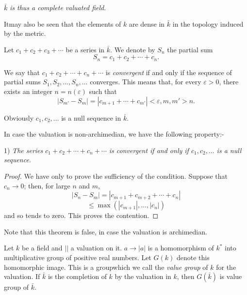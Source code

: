 $\bar{k}$ \textit{is thus a complete valuated field}. 

It\pageoriginale may also be seen that the elements of $k$ are dense
in $\bar{k}$ in the topology induced by the metric.  

Let $c_1 + c_2 + c_3 +  \cdots $ be a series in $\bar{k}$. We denote
by $S_n$ the partial sum 
$$
S_n = c_1 + c_2 + \cdots + c_n .
$$

We say that $c_1 + c_2 + \cdots + c_n + \cdots$ is \textit{convergent}
if and only if the sequence of partial sums $S_1 , S_2 , \ldots , 
S_n , \ldots$ converges. This means that, for every $\varepsilon > 0$,
there exists an integer $n = n(\varepsilon)$ such that 
$$
|S_{m'} - S_m| = |c_{m+1} + \cdots + c_{m'}| < \varepsilon , m, m' > n .
$$

Obviously $c_1 , c_2 , \ldots $ is a null sequence in $\bar{k}$.

In case the valuation is non-archimedian, we have the following
property:- 

1) \textit{The series $c_1 + c_2 + \cdots + c_n + \cdots$ is
  convergent if and only if $c_1 , c_2 , \ldots$ is a null
  sequence}. 

\begin{proof}%
We have only to prove the sufficiency of the condition. 
Suppose that $c_n \to 0$; then, for large $n$ and $m$,
$$
|S_n - S_m| = |c_{m+1} + c_{m+2} + \cdots + c_n|
$$
$$
\le \max (|c_{m+1}| , \ldots , |c_n|)
$$
and so tends to zero. This proves the contention.
\end{proof}

Note that this theorem is false, in case the valuation is archimedian.

Let $k$ be a field and $| |$ a valuation on it. $a \to |a|$ is a
homomorphism of $k^*$ into multiplicative group of positive real
numbers. Let $G(k)$ denote this homomorphic image. This is a
group\pageoriginale which we call the \textit{value group} of $k$ for
the valuation. If $\bar{k}$ is the completion of $k$ by the valuation
in $k$, then $G(\bar{k})$ is value group of $\bar{k}$.  

